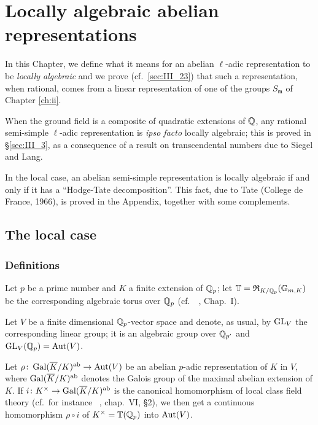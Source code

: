 \chapter{Locally algebraic abelian representations}
\label{ch:iii}

\dpage
In this Chapter, we define what it means for an abelian $\ell$-adic
representation to be \emph{locally algebraic} and we prove (cf.\
\ref{sec:III_23}) that such a representation, when rational, comes from a
linear representation of one of the groups $S_{\mathfrak{m}}$ of Chapter
\ref{ch:ii}.

When the ground field is a composite of quadratic extensions of $\mathbb{Q}$, any
rational semi-simple $\ell$-adic representation is \emph{ipso facto} locally
algebraic; this is proved in \S\ref{sec:III_3}, as a consequence of a result on
transcendental numbers due to Siegel and Lang.

In the local case, an abelian semi-simple representation is
locally algebraic if and only if it has a ``Hodge-Tate decomposition''.
This fact, due to Tate (College de France, 1966), is proved in the
Appendix, together with some complements.

\section{The local case}
\label{sec:III_1}

\subsection{Definitions}
\label{sec:III_11}
Let $p$ be a prime number and $K$ a finite extension of $\mathbb{Q}_p$; let $\mathbb{T} =
\operatorname{\mathfrak{R}}_{K/\mathbb{Q}_p}(\mathbb{G}_{m, K})$ be the corresponding algebraic torus over
\dpage
$\mathbb{Q}_p$ (cf.\ \citeauthor{43}~\cite{43}, Chap.~I).

Let $V$ be a finite dimensional $\mathbb{Q}_p$-vector space and denote, as usual, by
$\operatorname{GL}_V$ the corresponding linear group; it is an algebraic group over $\mathbb{Q}_{p'}$
and $\operatorname{GL}_V(\mathbb{Q}_p) = \operatorname{Aut}(V)$.

Let $\rho \colon \operatorname{Gal}(\overline{K}/K)^{\mathrm{ab}} \to \operatorname{Aut}(V)$ be an abelian $p$-adic
representation of $K$ in $V$, where $\operatorname{Gal}(\overline{K}/K)^{\mathrm{ab}}$ denotes the Galois
group of the maximal abelian extension of $K$.
If $i \colon K^\times \to \operatorname{Gal}(\overline{K}/K)^{\mathrm{ab}}$ is the canonical homomorphism
of local class field theory (cf.\ for instance \citeauthor{6}~\cite{6},
chap.~VI, \S2), we then get a continuous homomorphism $\rho \circ i$ of
$K^\times = \mathbb{T}(\mathbb{Q}_p)$ into $\operatorname{Aut}(V)$.

